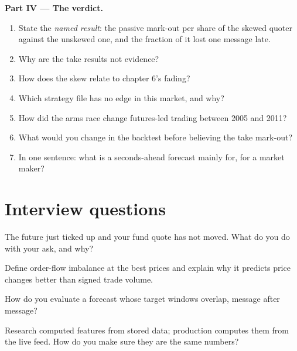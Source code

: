 \begin{problem}
\medskip\noindent\textbf{Part IV --- The verdict.}
\begin{enumerate}[resume]
\item State the \emph{named result}: the passive mark-out per share of the skewed quoter against the unskewed one, and the fraction of it lost one
message late.
\item Why are the take results not evidence?
\item How does the skew relate to chapter 6's fading?
\item Which strategy file has no edge in this market, and why?
\item How did the arms race change futures-led trading between 2005 and 2011?
\item What would you change in the backtest before believing the take mark-out?
\item In one sentence: what is a seconds-ahead forecast mainly for, for a market maker?
\end{enumerate}
\end{problem}

\section{Interview questions}

\begin{interviewq}\label{iq:hf:short-horizon-alpha:1}
The future just ticked up and your fund quote has not moved. What do you do with your ask, and why?
\end{interviewq}

\begin{interviewq}\label{iq:hf:short-horizon-alpha:2}
Define order-flow imbalance at the best prices and explain why it predicts price changes better than signed trade volume.
\end{interviewq}

\begin{interviewq}\label{iq:hf:short-horizon-alpha:3}
How do you evaluate a forecast whose target windows overlap, message after message?
\end{interviewq}

\begin{interviewq}\label{iq:hf:short-horizon-alpha:4}
Research computed features from stored data; production computes them from the live feed. How do you make sure they are the same numbers?
\end{interviewq}

